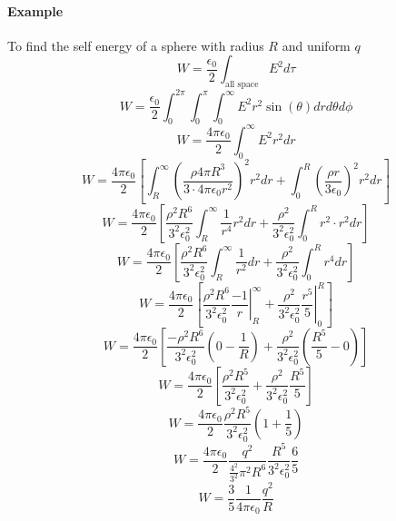 \documentclass{article}
\begin{document}
\paragraph{Example} To find the self energy of a sphere with radius $R$ and uniform $q$
\[ W = \frac{\epsilon_0}{2} \int_{\text{all space}} E^2 d\tau\]
\[ W = \frac{\epsilon_0}{2} \int_{0}^{2\pi}\int_{0}^{\pi} \int_{0}^{\infty} E^2 r^2 \sin(\theta) dr d\theta d\phi\]
\[ W = \frac{4 \pi \epsilon_0}{2} \int_{0}^{\infty} E^2 r^2 dr \]
\[ W = \frac{4 \pi \epsilon_0}{2} \left[ \int_{R}^{\infty} \left( \frac{\rho 4 \pi R^3}{3\cdot 4 \pi \epsilon_0 r^2}\right)^2 r^2 dr + \int_{0}^{R} \left( \frac{\rho r}{3 \epsilon_0}\right)^2 r^2 dr \right]\]
\[ W = \frac{4 \pi \epsilon_0}{2} \left[ \frac{\rho ^2 R^6}{3^2 \epsilon_0^2} \int_{R}^{\infty}  \frac{1}{r^4} r^2 dr + \frac{\rho^2}{3^2 \epsilon_0^2} \int_{0}^{R} r^2\cdot r^2 dr \right]\]
\[ W = \frac{4 \pi \epsilon_0}{2} \left[ \frac{\rho ^2 R^6}{3^2 \epsilon_0^2} \int_{R}^{\infty}  \frac{1}{r^2} dr + \frac{\rho^2}{3^2 \epsilon_0^2} \int_{0}^{R} r^4 dr \right]\]
\[ W = \frac{4 \pi \epsilon_0}{2} \left[ \frac{\rho ^2 R^6}{3^2 \epsilon_0^2} \left. \frac{-1}{r} \right|_R^{\infty}+ \left. \frac{\rho^2}{3^2 \epsilon_0^2} \frac{r^5}{5} \right|_0^R  \right]\]
\[ W = \frac{4 \pi \epsilon_0}{2} \left[\frac{-\rho ^2 R^6}{3^2 \epsilon_0^2} (0 - \frac{1}{R}) + \frac{\rho^2}{3^2 \epsilon_0^2} \left( \frac{R^5}{5} -0\right)  \right]\]
\[ W = \frac{4 \pi \epsilon_0}{2} \left[ \frac{\rho ^2 R^5}{3^2 \epsilon_0^2} + \frac{\rho^2}{3^2 \epsilon_0^2} \frac{R^5}{5}\right]\]
\[ W = \frac{4 \pi \epsilon_0}{2} \frac{\rho^2 R^5}{3^2 \epsilon_0^2} \left(1 + \frac{1}{5}\right) \]
\[ W = \frac{4 \pi \epsilon_0}{2} \frac{q^2}{\frac{4^2}{3^2} \pi^2 R^6} \frac{R^5}{3^2 \epsilon_0^2} \frac{6}{5}\]
\[ W = \frac{3}{5} \frac{1}{4 \pi \epsilon_0} \frac{q^2}{R}\]
\end{document}
